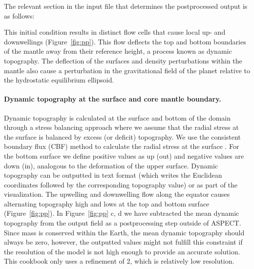 \documentclass{article}
\newcommand{\aspect}{\textsc{ASPECT}}
\begin{document}
The relevant section in the input file that determines the postprocessed
output is as follows:



This initial condition results in distinct flow cells that cause local up- and
downwellings (Figure~\ref{fig:pp}). This flow deflects the top and bottom boundaries
of the mantle away from their reference height, a process known as dynamic topography.
The deflection of the surfaces and density perturbations within the mantle also
cause a perturbation in the gravitational field of the planet relative to the
hydrostatic equilibrium ellipsoid.

\paragraph{Dynamic topography at the surface and core mantle boundary.}
Dynamic topography is calculated at the surface and bottom of the domain
through a stress balancing approach where we assume that the radial stress at
the surface is balanced by excess (or deficit) topography. We use the
consistent boundary flux (CBF) method to calculate the radial stress
at the surface \cite{ZGH93}. For the
bottom surface we define positive values as up (out)
and negative values are down (in), analogous to the deformation of the upper
surface. Dynamic topography can be outputted in text format (which writes the
Euclidean coordinates followed by the corresponding topography value) or as
part of the visualization. The upwelling and downwelling flow along the
equator causes alternating topography high and lows at the top and
bottom surface (Figure~\ref{fig:pp}).
In Figure~\ref{fig:pp} c, d we have subtracted the mean dynamic topography from
the output field as a postprocessing step outside of \aspect{}. Since mass is
conserved within the Earth, the mean dynamic topography
should always be zero, however, the outputted values might not fulfill this
constraint if the resolution of the model is not high enough to provide an
accurate solution. This cookbook only uses a refinement of 2, which is relatively
low resolution.
\end{document}

